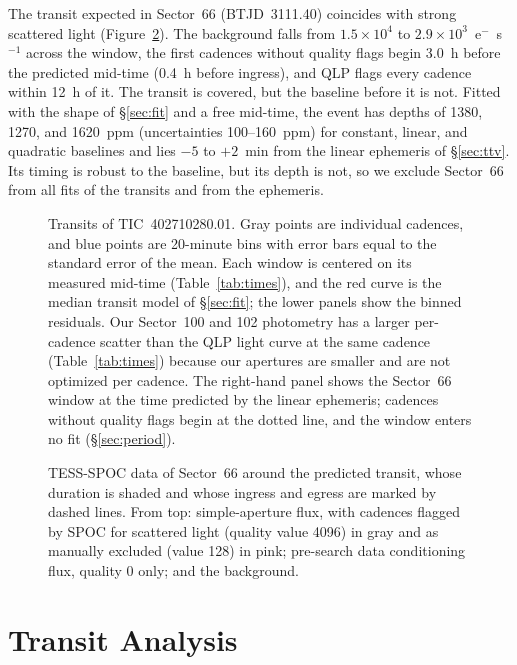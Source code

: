 \documentclass[twocolumn,linenumbers]{aastex701}
\newcommand{\planet}{TIC~402710280.01}
\begin{document}
The transit expected in Sector~66 (BTJD~3111.40) coincides with strong scattered light (Figure~\ref{fig:s66}). The background falls from $1.5 \times 10^4$ to $2.9 \times 10^3$~e$^-$~s$^{-1}$ across the window, the first cadences without quality flags begin 3.0~h before the predicted mid-time (0.4~h before ingress), and QLP flags every cadence within 12~h of it. The transit is covered, but the baseline before it is not. Fitted with the shape of \S\ref{sec:fit} and a free mid-time, the event has depths of 1380, 1270, and 1620~ppm (uncertainties 100--160~ppm) for constant, linear, and quadratic baselines and lies $-5$ to $+2$~min from the linear ephemeris of \S\ref{sec:ttv}. Its timing is robust to the baseline, but its depth is not, so we exclude Sector~66 from all fits of the transits and from the ephemeris.

\begin{figure}
\caption{Transits of \planet. Gray points are individual cadences, and blue points are 20-minute bins with error bars equal to the standard error of the mean. Each window is centered on its measured mid-time (Table~\ref{tab:times}), and the red curve is the median transit model of \S\ref{sec:fit}; the lower panels show the binned residuals. Our Sector~100 and 102 photometry has a larger per-cadence scatter than the QLP light curve at the same cadence (Table~\ref{tab:times}) because our apertures are smaller and are not optimized per cadence. The right-hand panel shows the Sector~66 window at the time predicted by the linear ephemeris; cadences without quality flags begin at the dotted line, and the window enters no fit (\S\ref{sec:period}).\label{fig:transits}}
\end{figure}

\begin{figure}
\caption{TESS-SPOC data of Sector~66 around the predicted transit, whose duration is shaded and whose ingress and egress are marked by dashed lines. From top: simple-aperture flux, with cadences flagged by SPOC for scattered light (quality value 4096) in gray and as manually excluded (value 128) in pink; pre-search data conditioning flux, quality 0 only; and the background.\label{fig:s66}}
\end{figure}

\section{Transit Analysis} \label{sec:analysis}
\end{document}
